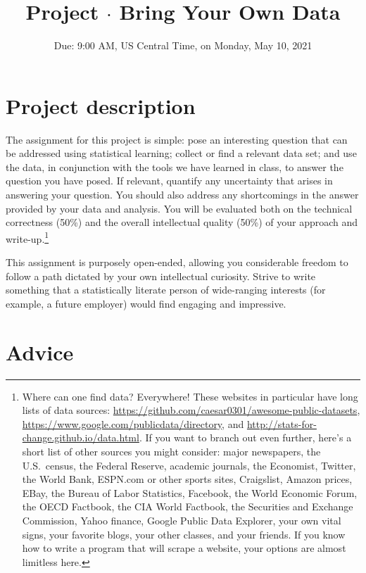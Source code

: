 \documentclass{mynotes}
\title[Project $\cdot$ ECO 395M]{Project $\cdot$ Bring Your Own Data}
\date{Due: 9:00 AM, US Central Time, on Monday, May 10, 2021}  %
\begin{document}
\maketitle%


\section{Project description}

The assignment for this project is simple: pose an interesting question that can be addressed using statistical learning; collect or find a relevant data set; and use the data, in conjunction with the tools we have learned in class, to answer the question you have posed.  If relevant, quantify any uncertainty that arises in answering your question.  You should also address any shortcomings in the answer provided by your data and analysis.   You will be evaluated both on the technical correctness (50\%) and the overall intellectual quality (50\%) of your approach and write-up.\footnote{Where can one find data?  Everywhere!  These websites in particular have long lists of data sources: \url{https://github.com/caesar0301/awesome-public-datasets}, \url{https://www.google.com/publicdata/directory}, and  \url{http://stats-for-change.github.io/data.html}.   If you want to branch out even further, here's a short list of other sources you might consider: major newspapers, the U.S.~census, the Federal Reserve, academic journals, the Economist, Twitter, the World Bank, ESPN.com or other sports sites, Craigslist, Amazon prices, EBay, the Bureau of Labor Statistics, Facebook, the World Economic Forum, the OECD Factbook, the CIA World Factbook, the Securities and Exchange Commission, Yahoo finance, Google Public Data Explorer,  your own vital signs, your favorite blogs, your other classes, and your friends.  If you know how to write a program that will scrape a website, your options are almost limitless here. }

This assignment is purposely open-ended, allowing you considerable freedom to follow a path dictated by your own intellectual curiosity.  Strive to write something that a statistically literate person of wide-ranging interests (for example, a future employer) would find engaging and impressive.

\section{Advice}
\end{document}
